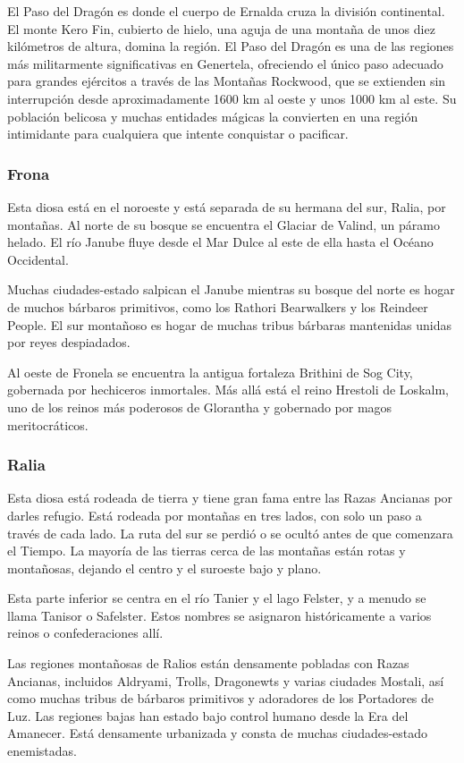 El Paso del Dragón es donde el cuerpo de Ernalda cruza la división continental. El monte Kero Fin, cubierto de hielo, una aguja de una montaña de unos diez kilómetros de altura, domina la región. El Paso del Dragón es una de las regiones más militarmente significativas en Genertela, ofreciendo el único paso adecuado para grandes ejércitos a través de las Montañas Rockwood, que se extienden sin interrupción desde aproximadamente 1600 km al oeste y unos 1000 km al este. Su población belicosa y muchas entidades mágicas la convierten en una región intimidante para cualquiera que intente conquistar o pacificar. 

\subsubsection{Frona}
Esta diosa está en el noroeste y está separada de su hermana del sur, Ralia, por montañas. Al norte de su bosque se encuentra el Glaciar de Valind, un páramo helado. El río Janube fluye desde el Mar Dulce al este de ella hasta el Océano Occidental. 

Muchas ciudades-estado salpican el Janube mientras su bosque del norte es hogar de muchos bárbaros primitivos, como los Rathori Bearwalkers y los Reindeer People. El sur montañoso es hogar de muchas tribus bárbaras mantenidas unidas por reyes despiadados. 

Al oeste de Fronela se encuentra la antigua fortaleza Brithini de Sog City, gobernada por hechiceros inmortales. Más allá está el reino Hrestoli de Loskalm, uno de los reinos más poderosos de Glorantha y gobernado por magos meritocráticos. 

\subsubsection{Ralia}
Esta diosa está rodeada de tierra y tiene gran fama entre las Razas Ancianas por darles refugio. Está rodeada por montañas en tres lados, con solo un paso a través de cada lado. La ruta del sur se perdió o se ocultó antes de que comenzara el Tiempo. La mayoría de las tierras cerca de las montañas están rotas y montañosas, dejando el centro y el suroeste bajo y plano. 

Esta parte inferior se centra en el río Tanier y el lago Felster, y a menudo se llama Tanisor o Safelster. Estos nombres se asignaron históricamente a varios reinos o confederaciones allí. 

Las regiones montañosas de Ralios están densamente pobladas con Razas Ancianas, incluidos Aldryami, Trolls, Dragonewts y varias ciudades Mostali, así como muchas tribus de bárbaros primitivos y adoradores de los Portadores de Luz. 	Las regiones bajas han estado bajo control humano desde la Era del Amanecer. Está densamente urbanizada y consta de muchas ciudades-estado enemistadas. 



